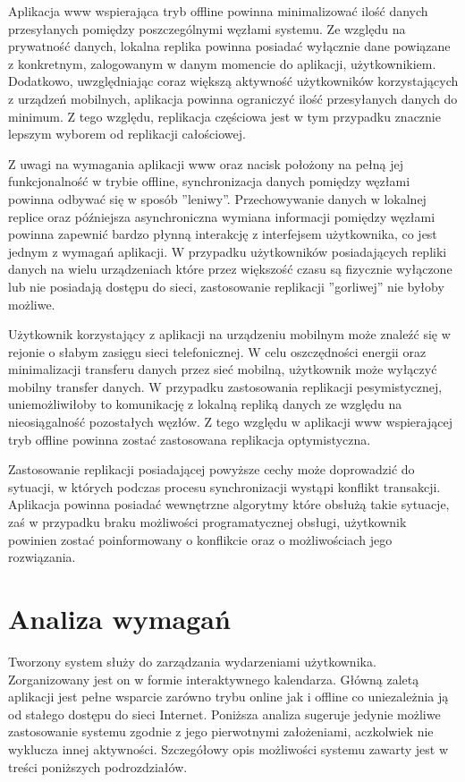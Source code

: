 Aplikacja www wspierająca tryb offline powinna minimalizować ilość danych przesyłanych pomiędzy poszczególnymi węzłami systemu. Ze względu na prywatność danych, lokalna replika powinna posiadać wyłącznie dane powiązane z konkretnym, zalogowanym w danym momencie do aplikacji, użytkownikiem. Dodatkowo, uwzględniając coraz większą aktywność użytkowników korzystających z urządzeń mobilnych, aplikacja powinna ograniczyć ilość przesyłanych danych do minimum. Z tego względu, replikacja częściowa jest w tym przypadku znacznie lepszym wyborem od replikacji całościowej.

Z uwagi na wymagania aplikacji www oraz nacisk położony na pełną jej funkcjonalność w trybie offline, synchronizacja danych pomiędzy węzłami powinna odbywać się w sposób ''leniwy''. Przechowywanie danych w lokalnej replice oraz późniejsza asynchroniczna wymiana informacji pomiędzy węzłami powinna zapewnić bardzo płynną interakcję z interfejsem użytkownika, co jest jednym z wymagań aplikacji.  W przypadku użytkowników posiadających repliki danych na wielu urządzeniach które przez większość czasu są fizycznie wyłączone lub nie posiadają dostępu do sieci, zastosowanie replikacji ''gorliwej'' nie byłoby możliwe.

Użytkownik korzystający z aplikacji na urządzeniu mobilnym może znaleźć się w rejonie o słabym zasięgu sieci telefonicznej. W celu oszczędności energii oraz minimalizacji transferu danych przez sieć mobilną, użytkownik może wyłączyć mobilny transfer danych. W przypadku zastosowania replikacji pesymistycznej, uniemożliwiłoby to komunikację z lokalną repliką danych ze względu na nieosiągalność pozostałych węzłów. Z tego względu w aplikacji www wspierającej tryb offline powinna zostać zastosowana replikacja optymistyczna.

Zastosowanie replikacji posiadającej powyższe cechy może doprowadzić do sytuacji, w których podczas procesu synchronizacji wystąpi konflikt transakcji. Aplikacja powinna posiadać wewnętrzne algorytmy które obsłużą takie sytuacje, zaś w przypadku braku możliwości programatycznej obsługi, użytkownik powinien zostać poinformowany o konflikcie oraz o możliwościach jego rozwiązania.

\section{Analiza wymagań}
\label{sec:analizaWymagan}

Tworzony system służy do zarządzania wydarzeniami użytkownika. Zorganizowany jest on w formie interaktywnego kalendarza. Główną zaletą aplikacji jest pełne wsparcie zarówno trybu online jak i offline co uniezależnia ją od stałego dostępu do sieci Internet. Poniższa analiza sugeruje jedynie możliwe zastosowanie systemu zgodnie z jego
pierwotnymi założeniami, aczkolwiek nie wyklucza innej aktywności. Szczegółowy opis możliwości systemu zawarty jest w treści poniższych podrozdziałów.

